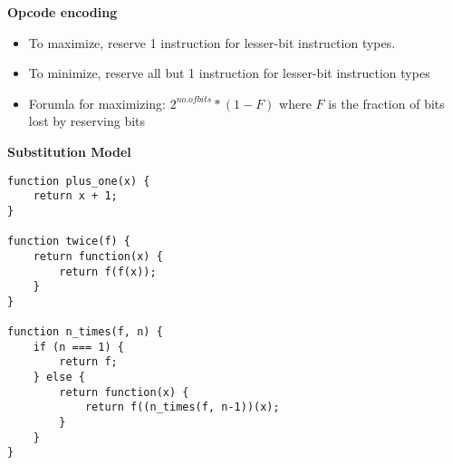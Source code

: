 \documentclass[a4paper]{article} \usepackage[backend=biber, style=numeric, sorting=none]{biblatex}
\begin{document}
\begin{multicols*}{4}
\textbf{Opcode encoding}
\begin{itemize}
\itemsep -0.5em
\item To maximize, reserve 1 instruction for lesser-bit instruction types.
\item To minimize, reserve all but 1 instruction for lesser-bit instruction types
\item Forumla for maximizing: $2^{no. of bits} * (1 - F)$ where $F$ is the fraction of bits lost by reserving bits
\end{itemize}

{\small\textbf{Substitution Model}}
\begin{verbatim}
function plus_one(x) {
    return x + 1;
}

function twice(f) {
    return function(x) {
        return f(f(x));
    }
}

function n_times(f, n) {
    if (n === 1) {
        return f;
    } else {
        return function(x) {
            return f((n_times(f, n-1))(x);
        }
    }
}


\end{verbatim}
\end{multicols*}
\end{document}
